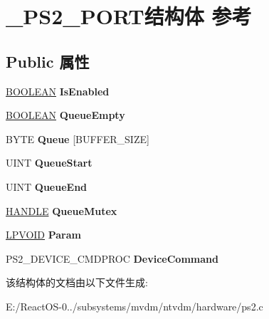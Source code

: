 \hypertarget{struct___p_s2___p_o_r_t}{}\section{\+\_\+\+P\+S2\+\_\+\+P\+O\+R\+T结构体 参考}
\label{struct___p_s2___p_o_r_t}
\subsection*{Public 属性}
\begin{DoxyCompactItemize}
\item 
\mbox{\label{struct___p_s2___p_o_r_t_ab7b9e71a8a361407b61fd2baa693af97}} 
\hyperlink{_processor_bind_8h_a112e3146cb38b6ee95e64d85842e380a}{B\+O\+O\+L\+E\+AN} {\bfseries Is\+Enabled}
\item 
\mbox{\label{struct___p_s2___p_o_r_t_a8d03ac5d65357064eaf0c9027d90fe86}} 
\hyperlink{_processor_bind_8h_a112e3146cb38b6ee95e64d85842e380a}{B\+O\+O\+L\+E\+AN} {\bfseries Queue\+Empty}
\item 
\mbox{\label{struct___p_s2___p_o_r_t_af10ffc5bc7ce8bf6e173edcf7dc3aa08}} 
B\+Y\+TE {\bfseries Queue} \mbox{[}B\+U\+F\+F\+E\+R\+\_\+\+S\+I\+ZE\mbox{]}
\item 
\mbox{\label{struct___p_s2___p_o_r_t_a51a467abbbddcc1fac6b03e7ce51568b}} 
U\+I\+NT {\bfseries Queue\+Start}
\item 
\mbox{\label{struct___p_s2___p_o_r_t_a56a96c2750bc475ea285d0f88715668a}} 
U\+I\+NT {\bfseries Queue\+End}
\item 
\mbox{\label{struct___p_s2___p_o_r_t_a50c6285eaaf212750763ca37ccc991a8}} 
\hyperlink{interfacevoid}{H\+A\+N\+D\+LE} {\bfseries Queue\+Mutex}
\item 
\mbox{\label{struct___p_s2___p_o_r_t_acb0eba583ec16805c59e5ad0a5e74c84}} 
\hyperlink{interfacevoid}{L\+P\+V\+O\+ID} {\bfseries Param}
\item 
\mbox{\label{struct___p_s2___p_o_r_t_af1b5e252254feea848d49308f967404a}} 
P\+S2\+\_\+\+D\+E\+V\+I\+C\+E\+\_\+\+C\+M\+D\+P\+R\+OC {\bfseries Device\+Command}
\end{DoxyCompactItemize}


该结构体的文档由以下文件生成\+:\begin{DoxyCompactItemize}
\item 
E\+:/\+React\+O\+S-\/0../subsystems/mvdm/ntvdm/hardware/ps2.\+c\end{DoxyCompactItemize}

